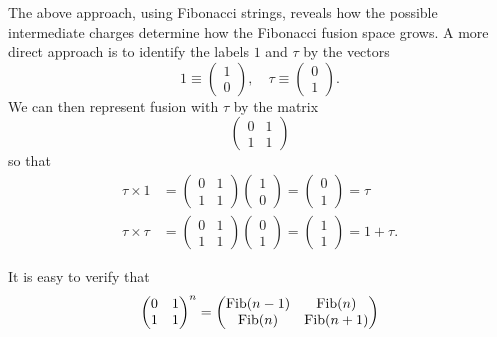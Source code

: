 The above approach, using Fibonacci strings, reveals how the possible intermediate charges determine how the Fibonacci fusion space grows. A more direct approach is to identify the labels $1$ and $\tau$ by the vectors
\begin{equation}
  1 \equiv \begin{pmatrix}1\\0\end{pmatrix}, \quad
  \tau \equiv \begin{pmatrix}0\\1\end{pmatrix}.
\end{equation}
We can then represent fusion with $\tau$ by the matrix
\begin{equation}
  \begin{pmatrix}
    0 & 1 \\
    1 & 1
  \end{pmatrix}
\end{equation}
so that
\begin{equation}
  \begin{aligned}
    \tau \times 1 &=
    \begin{pmatrix}
      0 & 1 \\
      1 & 1
    \end{pmatrix}
    \begin{pmatrix}
      1 \\ 0
    \end{pmatrix} =
    \begin{pmatrix}
      0 \\ 1
    \end{pmatrix}
    = \tau
    \\
    \tau \times \tau &=
    \begin{pmatrix}
      0 & 1 \\
      1 & 1
    \end{pmatrix}
    \begin{pmatrix}
      0 \\ 1
    \end{pmatrix} =
    \begin{pmatrix}
      1 \\ 1
    \end{pmatrix}
    = 1 + \tau.
  \end{aligned}
\end{equation}

It is easy to verify that
\begin{equation}
  \begin{pmatrix}
    0 & 1 \\
    1 & 1
  \end{pmatrix}^n
  =
  \begin{pmatrix}
    \operatorname{Fib}(n-1) & \operatorname{Fib}(n) \\
    \operatorname{Fib}(n) & \operatorname{Fib}(n+1)
  \end{pmatrix}
\end{equation}

